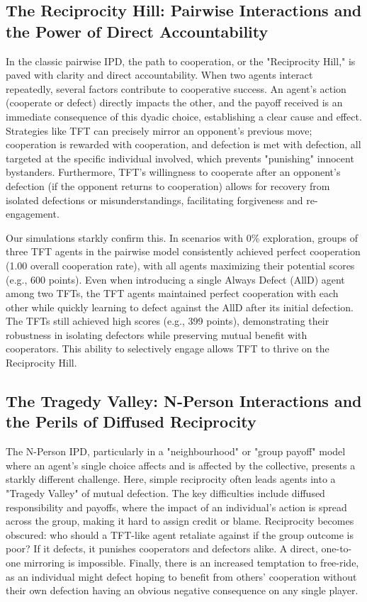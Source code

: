 \documentclass[]{llncs} %
\begin{document}
\subsection{The Reciprocity Hill: Pairwise Interactions and the Power of Direct Accountability}
In the classic pairwise IPD, the path to cooperation, or the "Reciprocity Hill," is paved with clarity and direct accountability. When two agents interact repeatedly, several factors contribute to cooperative success. An agent's action (cooperate or defect) directly impacts the other, and the payoff received is an immediate consequence of this dyadic choice, establishing a clear cause and effect. Strategies like TFT can precisely mirror an opponent's previous move; cooperation is rewarded with cooperation, and defection is met with defection, all targeted at the specific individual involved, which prevents "punishing" innocent bystanders. Furthermore, TFT's willingness to cooperate after an opponent's defection (if the opponent returns to cooperation) allows for recovery from isolated defections or misunderstandings, facilitating forgiveness and re-engagement.

Our simulations starkly confirm this. In scenarios with 0\% exploration, groups of three TFT agents in the pairwise model consistently achieved perfect cooperation (1.00 overall cooperation rate), with all agents maximizing their potential scores (e.g., 600 points). Even when introducing a single Always Defect (AllD) agent among two TFTs, the TFT agents maintained perfect cooperation with each other while quickly learning to defect against the AllD after its initial defection. The TFTs still achieved high scores (e.g., 399 points), demonstrating their robustness in isolating defectors while preserving mutual benefit with cooperators. This ability to selectively engage allows TFT to thrive on the Reciprocity Hill.

\subsection{The Tragedy Valley: N-Person Interactions and the Perils of Diffused Reciprocity}
The N-Person IPD, particularly in a "neighbourhood" or "group payoff" model where an agent's single choice affects and is affected by the collective, presents a starkly different challenge. Here, simple reciprocity often leads agents into a "Tragedy Valley" of mutual defection. The key difficulties include diffused responsibility and payoffs, where the impact of an individual's action is spread across the group, making it hard to assign credit or blame. Reciprocity becomes obscured: who should a TFT-like agent retaliate against if the group outcome is poor? If it defects, it punishes cooperators and defectors alike. A direct, one-to-one mirroring is impossible. Finally, there is an increased temptation to free-ride, as an individual might defect hoping to benefit from others' cooperation without their own defection having an obvious negative consequence on any single player.
\end{document}

